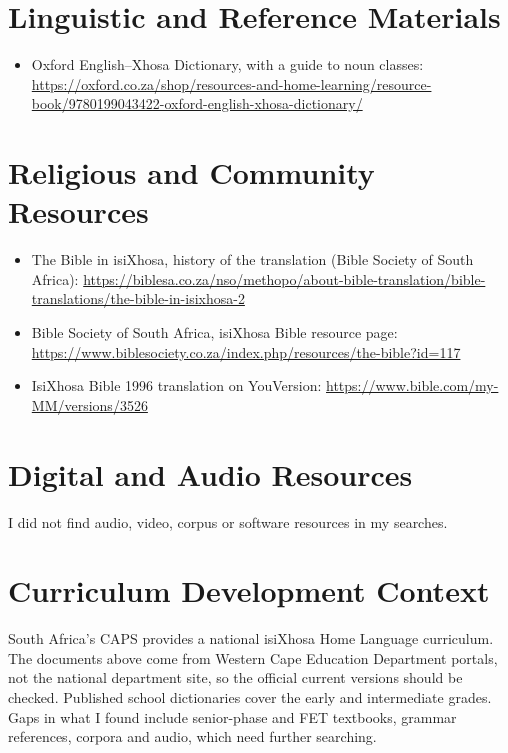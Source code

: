 \documentclass[12pt]{article}
\begin{document}
\section{Linguistic and Reference Materials}
\begin{itemize}
\item Oxford English--Xhosa Dictionary, with a guide to noun classes: \url{https://oxford.co.za/shop/resources-and-home-learning/resource-book/9780199043422-oxford-english-xhosa-dictionary/}
\end{itemize}

\section{Religious and Community Resources}
\begin{itemize}
\item The Bible in isiXhosa, history of the translation (Bible Society of South Africa): \url{https://biblesa.co.za/nso/methopo/about-bible-translation/bible-translations/the-bible-in-isixhosa-2}
\item Bible Society of South Africa, isiXhosa Bible resource page: \url{https://www.biblesociety.co.za/index.php/resources/the-bible?id=117}
\item IsiXhosa Bible 1996 translation on YouVersion: \url{https://www.bible.com/my-MM/versions/3526}
\end{itemize}

\section{Digital and Audio Resources}
I did not find audio, video, corpus or software resources in my searches.

\section{Curriculum Development Context}
South Africa's CAPS provides a national isiXhosa Home Language curriculum. The documents above come from Western Cape Education Department portals, not the national department site, so the official current versions should be checked. Published school dictionaries cover the early and intermediate grades. Gaps in what I found include senior-phase and FET textbooks, grammar references, corpora and audio, which need further searching.
\end{document}
